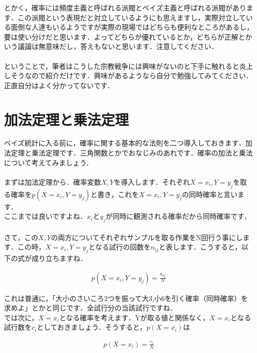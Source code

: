 \documentclass[11pt,a4paper,uplatex]{ujreport} 	%
\begin{document}
とかく，確率には頻度主義と呼ばれる派閥とベイズ主義と呼ばれる派閥があります．この派閥という表現だと対立しているようにも思えますし，実際対立している面倒な人達もいるようですが実際の現場ではどちらも便利なところがあるし，要は使い分けだと思います．よってどちらが優れているとか，どちらが正解とかいう議論は無意味だし，答えもないと思います．注意してください．\\
\\

ということで，筆者はこうした宗教戦争には興味がないのと下手に触れると炎上しそうなので紹介だけです．興味があるようなら自分で勉強してみてください．正直自分はよく分かってないです．

\section{加法定理と乗法定理}
ベイズ統計に入る前に，確率に関する基本的な法則を二つ導入しておきます．加法定理と乗法定理です．三角関数とかでおなじみのあれです．確率の加法と乗法について考えてみましょう．\\
\\

まずは加法定理から．確率変数$X,Y$を導入します．それぞれ$X=x_i, Y=y_j$を取る確率を$p(X=x_i, Y=y_j)$と書き，これを$X=x_i, Y=y_j$の同時確率と言います．\\

ここまでは良いですよね．$x_iとy_j$が同時に観測される確率だから同時確率です．\\
\\

さて，この$X, Y$の両方についてそれぞれサンプルを取る作業をN回行う事にします．この時，$X=x_i, Y=y_j$となる試行の回数を$n_{ij}$と表します．こうすると，以下の式が成り立ちますね．

\begin{align}
\label{eq:prob1}
p(X=x_i, Y=y_j) = \frac{n_{ij}}{N}
\end{align}

これは普通に，「大小のさいころ2つを振って大3,小6を引く確率（同時確率）を求めよ」とかと同じです．全試行分の当該試行ですね．
\\

では次に，$X=x_i$となる確率を考えます．Yが取る値と関係なく，$X=x_i$となる試行数を$c_i$としておきましょう．そうすると，$p(X=x_i)$は

\begin{align}
\label{eq:prob2}
p(X=x_i) = \frac{c_i}{N}
\end{align}
\end{document}
